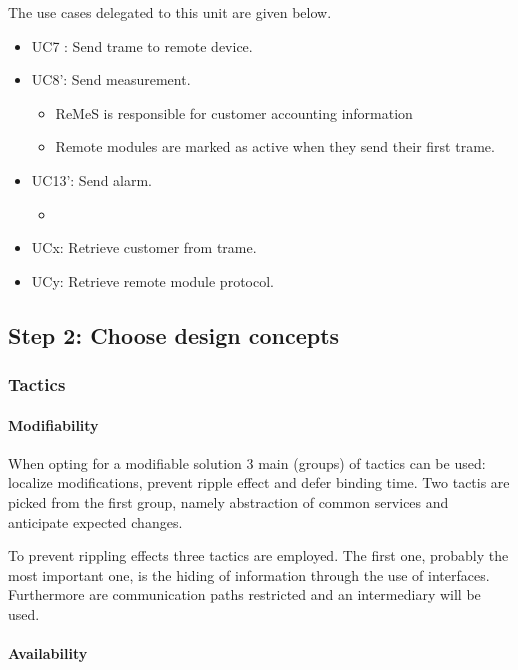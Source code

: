 \npar The use cases delegated to this unit are given below.

\begin{itemize}
  \item UC7 : Send trame to remote device.
  \item UC8': Send measurement.
  \begin{itemize}
    \item ReMeS is responsible for customer accounting information
    \item Remote modules are marked as active when they send their first trame.
  \end{itemize}
  \item UC13': Send alarm.
  \begin{itemize}
    \item %
  \end{itemize}
  \item UCx: Retrieve customer from trame.
  \item UCy: Retrieve remote module protocol.
\end{itemize}

\subsection{Step 2: Choose design concepts}
\label{add:it2/concepts}

\subsubsection{Tactics}
\label{add:it2/tactics}

\paragraph{Modifiability}

\npar When opting for a modifiable solution 3 main (groups) of tactics can be
used: localize modifications, prevent ripple effect and defer binding time.
Two tactis are picked from the first group, namely abstraction of common
services and anticipate expected changes.

\npar To prevent rippling effects three tactics are employed. The first one,
probably the most important one, is the hiding of information through the use of
interfaces. Furthermore are communication paths restricted and an intermediary
will be used.

\paragraph{Availability}

